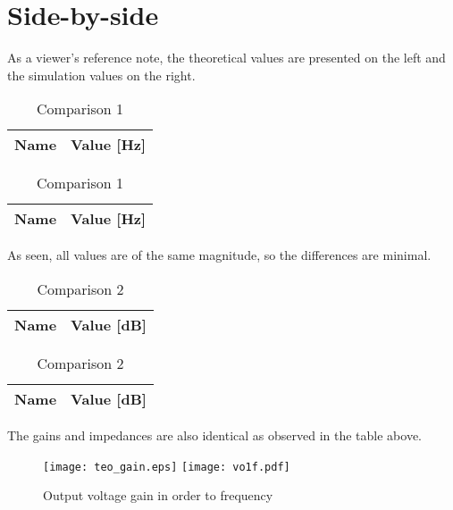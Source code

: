 \section{Side-by-side}
\label{sec:sbs}

As a viewer's reference note, the theoretical values are presented on the left and the simulation values on the right.

\begin{table}[h]
\begin{center}
  \begin{tabular}{|c|c|}
    \hline    
    {\bf Name} & {\bf Value [Hz]} \\ \hline
    
    \hline
  \end{tabular}
  \begin{tabular}{|c||c|}
    \hline    
    {\bf Name} & {\bf Value [Hz]} \\ \hline
    
    \hline
  \end{tabular}
  \caption{Comparison 1}
  \label{tab:comparison 1}
\end{center}
\end{table}
\FloatBarrier

As seen, all values are of the same magnitude, so the differences are minimal.

\begin{table}[h]
\begin{center}
  \begin{tabular}{|c|c|}
    \hline    
    {\bf Name} & {\bf Value [dB]} \\ \hline
    
    \hline
  \end{tabular}
  \begin{tabular}{|c||c|}
    \hline    
    {\bf Name} & {\bf Value [dB]} \\ \hline
    
    \hline
  \end{tabular}
  \caption{Comparison 2}
  \label{tab:comparison 2}
\end{center}
\end{table}
\FloatBarrier

The gains and impedances are also identical as observed in the table above.

\begin{figure}[h] \centering
\texttt{[image: teo\_gain.eps]}
\texttt{[image: vo1f.pdf]}
\caption{Output voltage gain in order to frequency}
\label{fig:comparison 3}
\end{figure}
\FloatBarrier

